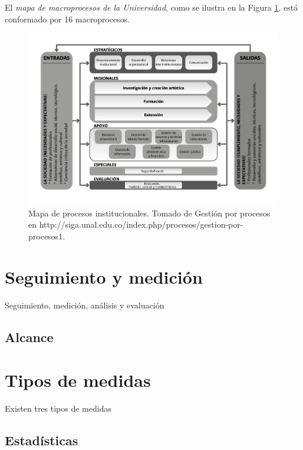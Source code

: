 \documentclass[
]{book}
\begin{document}
El \emph{mapa de macroprocesos de la Universidad}, como se ilustra en la Figura \ref{fig:fig2}, está conformado por 16 macroprocesos.

\begin{figure}

{\centering \includegraphics[width=0.8\linewidth]{Imagenes/F_2} 

}

\caption{Mapa de procesos institucionales. Tomado de Gestión por procesos en http://siga.unal.edu.co/index.php/procesos/gestion-por-procesos1.}\label{fig:fig2}
\end{figure}

\hypertarget{medicion}{%
\chapter{Seguimiento y medición}\label{medicion}}

Seguimiento, medición, análisis y evaluación

\hypertarget{alcance}{%
\section{Alcance}\label{alcance}}

\hypertarget{medidas}{%
\chapter{Tipos de medidas}\label{medidas}}

Existen tres tipos de medidas

\hypertarget{estaduxedsticas}{%
\section{Estadísticas}\label{estaduxedsticas}}
\end{document}

